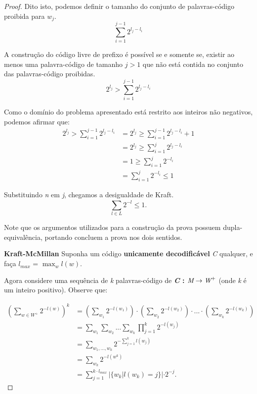 \begin{lemma}
\begin{proof}
Dito isto, podemos definir o tamanho do conjunto de palavras-código proibida para $w_j$.
\begin{equation*}
\sum_{i=1}^{j-1} 2^{l_j - l_i}
\end{equation*}

A construção do código livre de prefixo é possível se e somente se, existir ao menos uma palavra-código de tamanho $j > 1$ que não está contida no conjunto das palavras-código proibidas.
\begin{equation*}
2^{l_j} > \sum_{i=1}^{j-1} 2^{l_j - l_i}
\end{equation*}

Como o domínio do problema apresentado está restrito aos inteiros não negativos, podemos afirmar que:
\begin{align*}
2^{l_j} > \sum_{i=1}^{j-1} 2^{l_j - l_i} &= 2^{l_j} \geq \sum_{i=1}^{j-1} 2^{l_j - l_i} + 1 \\
&= 2^{l_j} \geq \sum_{i=1}^{j} 2^{l_j - l_i} \\
&= 1 \geq \sum_{i=1}^{j} 2^{-l_i} \\
&=  \sum_{i=1}^{j} 2^{-l_i} \leq 1
\end{align*}

Substituindo \emph{n} em \emph{j}, chegamos a desigualdade de Kraft.
\begin{equation*}
\sum_{l \in L}^{} 2^{-l} \leq 1.
\end{equation*}

Note que os argumentos utilizados para a construção da prova possuem dupla-equivalência, portando concluem a prova nos dois sentidos.

\item \textbf{Kraft-McMillan}
Suponha um código \textbf{unicamente decodificável} \emph{C} qualquer, e faça $l_{max}$ = $\max_{w}l(w)$.

Agora considere uma sequência de \emph{k} palavras-código de \textbf{\emph{C} : $\emph{M} \rightarrow \emph{W}^+$} (onde \emph{k} é um inteiro positivo). Observe que:

\begin{align*}
(\sum_{w \in W^+}^{}2^{-l(w)})^k &= (\sum_{w_1}^{}2^{-l(w_1)}) \cdot (\sum_{w_2}^{}2^{-l(w_2)}) \cdot ... \cdot (\sum_{w_k}^{}2^{-l(w_k)}) \\
&= \sum_{w_1}^{} \sum_{w_2}^{} ... \sum_{w_k}^{} \prod_{j = 1}^{k} 2^{-l(w_j)} \\
&= \sum_{w_1,..., w_k}^{} 2^{- \sum_{j=1}^{k} l(w_j)} \\
&= \sum_{w_k}^{} 2^{-l(w^k)} \\
&= \sum_{j=1}^{k \cdot l_{max}} |\{w_k | l(w_k) = j\}| \cdot 2^{-j}.
\end{align*}


\end{proof}
\end{lemma}
